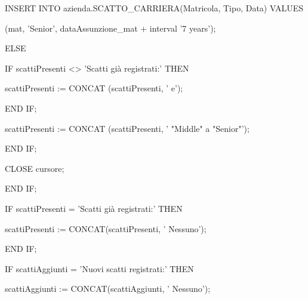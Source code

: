 \begin{flushleft}
\begin{description}
\begin{description}
\begin{description}
\begin{description}
\begin{description}
                                    \item INSERT INTO azienda.SCATTO\_CARRIERA(Matricola, Tipo, Data) VALUES
                                    \item (mat, 'Senior', dataAssunzione\_mat + interval '7 years');
                                \end{description}   
                                \item ELSE 
                                \begin{description}
                                    \item IF scattiPresenti <> 'Scatti già registrati:' THEN
                                    \begin{description}
                                        \item scattiPresenti := CONCAT (scattiPresenti, ' e');
                                    \end{description}
                                    \item END IF;
                                    \item scattiPresenti := CONCAT (scattiPresenti, ' "Middle" a "Senior"');
                                \end{description}
                            \item END IF;
                            \item CLOSE cursore;
                            \end{description}
                            \item END IF;
                            \vspace{0.5cm}
                            \item IF scattiPresenti = 'Scatti già registrati:' THEN
                            \begin{description}
                                \item scattiPresenti := CONCAT(scattiPresenti, ' Nessuno');
                            \end{description}
                            \item END IF;
                            \vspace{0.5cm}
                            \item IF scattiAggiunti = 'Nuovi scatti registrati:' THEN
                            \begin{description}
                                \item scattiAggiunti := CONCAT(scattiAggiunti, ' Nessuno');

\end{description}
\end{description}
\end{description}
\end{description}
\end{flushleft}
